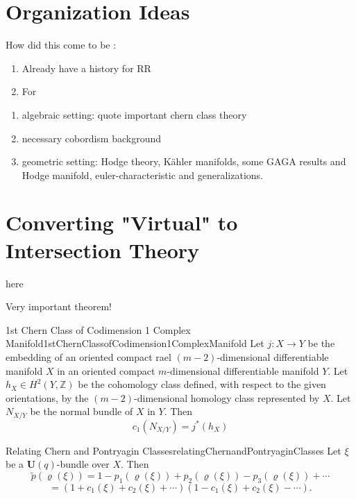 \documentclass{book}
\begin{document}
\chapter{Organization Ideas}

How did this come to be :
\begin{enumerate}
  \item Already have a history for RR
  \item For
\end{enumerate}

\begin{enumerate}
  \item algebraic setting: quote important chern class theory
  \item necessary cobordism background
  \item geometric setting: Hodge theory, K\"ahler manifolds, some GAGA results and Hodge manifold, euler-characteristic and generalizations.
\end{enumerate}


\chapter{Converting "Virtual" to Intersection Theory}

here

Very important theorem!

\begin{thm}{1st Chern Class of Codimension 1 Complex Manifold}{1stChernClassofCodimension1ComplexManifold}
Let $j: X \to Y$ be the embedding of an oriented compact rael $(m-2)$-dimensional differentiable manifold $X$ in an
oriented compact $m$-dimensional differentiable manifold $Y$. Let $h_X \in H^2(Y,\mathbb{Z})$ be the cohomology
class defined, with respect to the given orientations, by the $(m-2)$-dimensional homology class represented
by $X$. Let $N_{X/Y}$ be the normal bundle of $X$ in $Y$. Then
\[
  c_1(N_{X/Y}) = j^*(h_X)
\]
\end{thm}

\begin{Proof}
  \cite[theorem 4.8.1]{hirzebruchTopologicalMethodsAlgebraic1995}
\end{Proof}

\begin{thm}{Relating Chern and Pontryagin Classes}{relatingChernandPontryaginClasses}
Let $\xi$ be a $\mathbf{U}(q)$-bundle over $X$. Then
\[
    \tilde{p}(\varrho(\xi)) = 1 - p_1(\varrho(\xi)) + p_2(\varrho(\xi)) - p_3(\varrho(\xi)) + \cdots
\]
\[
    = (1 + c_1(\xi) + c_2(\xi) + \cdots)(1 - c_1(\xi) + c_2(\xi) - \cdots).
\]
\end{thm}
\end{document}

